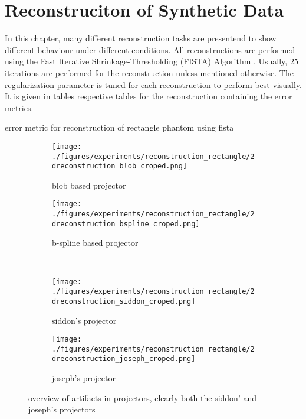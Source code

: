 \section{Reconstruciton of Synthetic Data}\label{sec:experiments_synthethic_projection}

In this chapter, many different reconstruction tasks are presentend to show different behaviour
under different conditions. All reconstructions are performed using the Fast Iterative
Shrinkage-Thresholding (FISTA) Algorithm . Usually, \(25\) iterations are
performed for the reconstruction unless mentioned otherwise. The regularization parameter is tuned
for each reconstruction to perform best visually. It is given in tables respective tables for the
reconstruction containing the error metrics.

\begin{table}%
	\centering
	\caption{error metric for reconstruction of rectangle phantom using fista}%
	\label{tab:error_metric_shepp_logan}
\end{table}

\begin{figure}[h]
	\centering
	\begin{subfigure}[b]{0.45\textwidth}
		\centering
		\texttt{[image: ./figures/experiments/reconstruction\_rectangle/2dreconstruction\_blob\_croped.png]}
		\caption{blob based projector}%
		\label{fig:rectangle_recon_artifacts_blob}
	\end{subfigure}
	\begin{subfigure}[b]{0.45\textwidth}
		\centering
		\texttt{[image: ./figures/experiments/reconstruction\_rectangle/2dreconstruction\_bspline\_croped.png]}
		\caption{b-spline based projector}%
		\label{fig:rectangle_recon_artifacts_bspline}
	\end{subfigure} \\
	\begin{subfigure}[b]{0.45\textwidth}
		\centering
		\texttt{[image: ./figures/experiments/reconstruction\_rectangle/2dreconstruction\_siddon\_croped.png]}
		\caption{siddon's projector}%
		\label{fig:rectangle_recon_artifacts_siddon}
	\end{subfigure}
	\begin{subfigure}[b]{0.45\textwidth}
		\centering
		\texttt{[image: ./figures/experiments/reconstruction\_rectangle/2dreconstruction\_joseph\_croped.png]}
		\caption{joseph's projector}%
		\label{fig:rectangle_recon_artifacts_joseph}
	\end{subfigure}
	\caption{overview of artifacts in projectors, clearly both the siddon' and joseph's
		projectors}%
	\label{fig:rectangle_recon_artifacts}
\end{figure}

